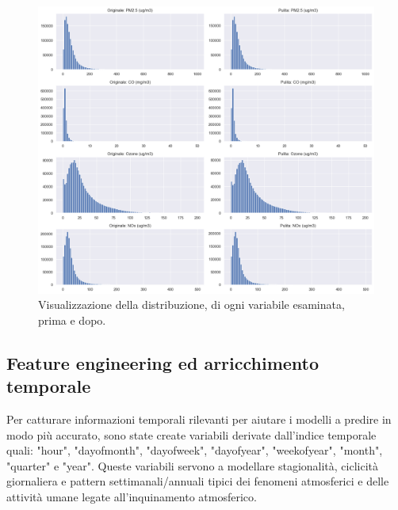 \documentclass[a4paper,12pt]{report}
\begin{document}
	\begin{figure}[H]
		\centering
		\includegraphics[width=1.0\textwidth]{img/distr_prepost_isofor_pm.png}
		\caption{Visualizzazione della distribuzione, di ogni variabile esaminata, prima e dopo.}
	\end{figure}
	
	\subsection{Feature engineering ed arricchimento temporale}
	Per catturare informazioni temporali rilevanti per aiutare i modelli a predire in modo più accurato, sono state create variabili derivate dall'indice temporale quali: "hour", "dayofmonth", "dayofweek", "dayofyear", "weekofyear", "month", "quarter" e "year". Queste variabili servono a modellare stagionalità, ciclicità giornaliera e pattern settimanali/annuali tipici dei fenomeni atmosferici e delle attività umane legate all'inquinamento atmosferico.
	
\end{document}
